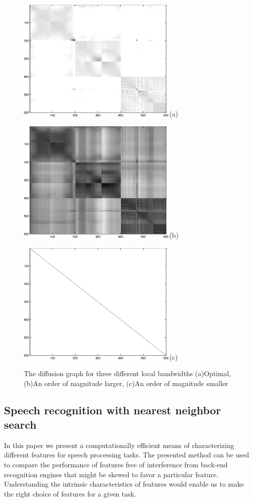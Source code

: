 \documentclass[12pt,letterpaper,doublespaced,ETD,dvips,proposal]{gtthesis}
\begin{document}
\begin{Body}
\begin{figure}[tb]
 \centerline{\includegraphics[height=6cm]{fig4b.eps}(a)}
\centerline{\includegraphics[height=6cm]{fig4d.eps}(b)}
\centerline{\includegraphics[height=6cm]{fig4f.eps}(c)}
 \caption{The diffusion graph for three different local bandwidths
(a)Optimal, (b)An order of magnitude larger, (c)An order of
magnitude smaller}
  \label{fig5}
\end{figure}
\subsection{Speech recognition with nearest neighbor search}

In this paper we present a computationally efficient means of
characterizing different features for speech processing tasks. The
presented method can be used to compare the performance of features
free of interference from back-end recognition engines that might be
skewed to favor a particular feature. Understanding the intrinsic
characteristics of features would enable us to make the right choice
of features for a given task.

\end{Body}
\end{document}
